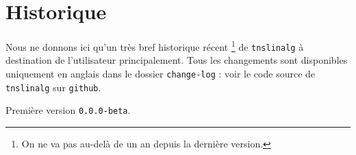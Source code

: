 \documentclass[12pt,a4paper]{article}
\begin{document}
\newpage

\section{Historique}

Nous ne donnons ici qu'un très bref historique récent
\footnote{
	On ne va pas au-delà de un an depuis la dernière version.
}
de \verb+tnslinalg+ à destination de l'utilisateur principalement.
Tous les changements sont disponibles uniquement en anglais dans le dossier \verb+change-log+ : voir le code source de \verb+tnslinalg+ sur \verb+github+.

\begin{description}

    \medskip
    \item[2020-07-10] Première version \verb+0.0.0-beta+.

\end{description}
\end{document}
